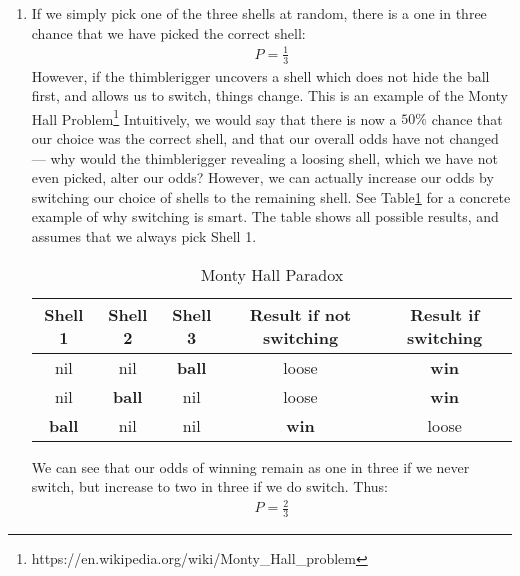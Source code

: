 \documentclass[a4paper,11pt]{article}
\author{\authorinfotitle}
\title{\titleinfo}
\date{\today}
\begin{document}
	\maketitle
	\begin{enumerate}
		\item[\textbf{1.}]
			If we simply pick one of the three shells at random, there
			is a one in three chance that we have picked the correct
			shell:
			\begin{align*}
				P = \frac{1}{3}
			\end{align*}
			However, if the thimblerigger uncovers a shell which does
			not hide the ball first, and allows us to switch, things
			change. This is an example of the Monty Hall Problem\footnote{https://en.wikipedia.org/wiki/Monty_Hall_problem}
			Intuitively, we would say that there is now a $50\%$ chance that
			our choice was the correct shell, and that our overall odds have
			not changed --- why would the thimblerigger revealing a loosing
			shell, which we have not even picked, alter our odds?
			However, we can actually increase our odds by switching
			our choice of shells to the remaining shell.
			See Table\ref{table_monty_hall} for a concrete example
			of why switching is smart. The table shows all possible
			results, and assumes that we always pick Shell 1.

			\begin{table}[H]
			\centering
			\caption{Monty Hall Paradox}
			\begin{tabular}{| c | c | c | c | c |}
				\hline
				\textbf{Shell 1} & \textbf{Shell 2} & \textbf{Shell 3} & \textbf{Result if not switching} & \textbf{Result if switching} \\
				\hline
				nil & nil & \textbf{ball} & loose & \textbf{win} \\
				nil & \textbf{ball} & nil & loose & \textbf{win} \\
				\textbf{ball} & nil & nil & \textbf{win} & loose \\
				\hline
			\end{tabular}
			\label{table_monty_hall}
			\end{table}

			We can see that our odds of winning remain as one in three
			if we never switch, but increase to two in three if we do
			switch. Thus:
			\begin{align*}
				P = \frac{2}{3}
			\end{align*}
	\end{enumerate}
\end{document}
